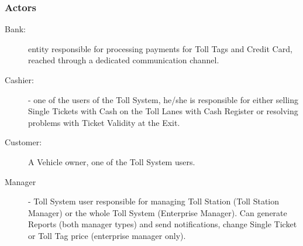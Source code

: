 \subsubsection{Actors}
\begin{description}

  \item[Bank:] entity responsible for processing payments for Toll Tags and Credit Card, reached through a dedicated communication channel.
  \item[Cashier:] - one of the users of the Toll System, he/she is responsible for either selling Single Tickets with Cash on the Toll Lanes with Cash Register or resolving problems with Ticket Validity at the Exit.
  \item[Customer:] A Vehicle owner, one of the Toll System users.
  \item[Manager] - Toll System user responsible for managing Toll Station (Toll Station Manager) or the whole Toll System (Enterprise Manager). Can generate Reports (both manager types) and send notifications, change Single Ticket or Toll Tag price (enterprise manager only).

\end{description}

